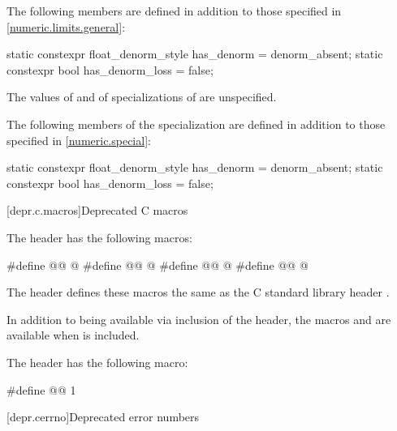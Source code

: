 \pnum
{}%
%
%
%
The following members are defined
in addition to those specified in \ref{numeric.limits.general}:
\begin{codeblock}
static constexpr float_denorm_style has_denorm = denorm_absent;
static constexpr bool has_denorm_loss = false;
\end{codeblock}

\pnum
The values of  and  of
specializations of  are unspecified.

\pnum
The following members of the specialization  are defined
in addition to those specified in \ref{numeric.special}:
%
%
\begin{codeblock}
static constexpr float_denorm_style has_denorm = denorm_absent;
static constexpr bool has_denorm_loss = false;
\end{codeblock}

[depr.c.macros]{Deprecated C macros}

\pnum
The header  has the following macros:
\begin{codeblock}
#define @@ @\seebelow@
#define @@ @\seebelow@
#define @@ @\seebelow@
#define @@ @\seebelow@
\end{codeblock}
The header defines these macros the same as
the C standard library header .


\pnum
In addition to being available via inclusion of the  header,
the macros  and  are
available when  is included.


\pnum
The header  has the following macro:
\begin{codeblock}
#define @@ 1
\end{codeblock}


[depr.cerrno]{Deprecated error numbers}

